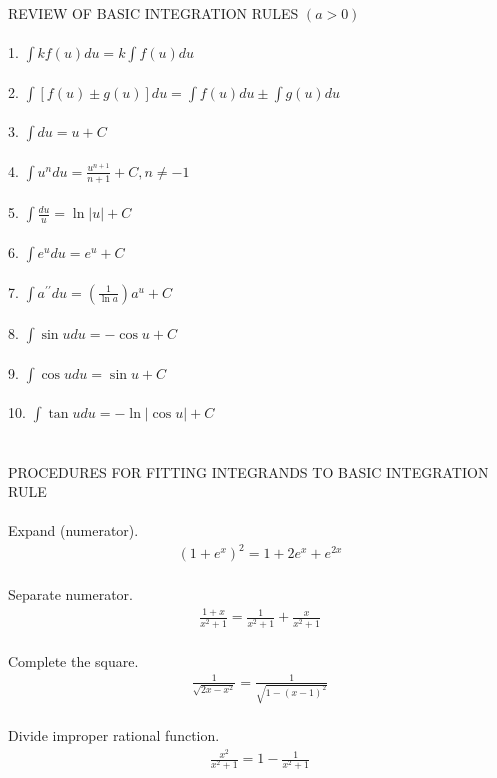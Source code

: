 \documentclass{report}
\begin{document}
REVIEW OF BASIC
INTEGRATION RULES $(a>0)$\\\\
1. $\int k f(u) d u=k \int f(u) d u$\\\\
2. $\int[f(u) \pm g(u)] d u= \int f(u) d u \pm \int g(u) d u$ \\\\
3. $\int d u=u+C$ \\\\
4. $\int u^n d u=\frac{u^{n+1}}{n+1}+C, n \neq-1$ \\\\
5. $\int \frac{d u}{u}=\ln |u|+C$ \\\\
6. $\int e^u d u=e^u+C$ \\\\
7. $\int a^{\prime \prime} d u=\left(\frac{1}{\ln a}\right) a^u+C$ \\\\
8. $\int \sin u d u=-\cos u+C$ \\\\
9. $\int \cos u d u=\sin u+C$ \\ \\
10. $\int \tan u d u=-\ln |\cos u|+C$ \\\\\\
PROCEDURES FOR FITTING INTEGRANDS TO BASIC INTEGRATION RULE \\\\

Expand (numerator).
\begin{align}
\left(1+e^x\right)^2=1+2 e^x+e^{2 x} \\
\end{align}

Separate numerator.
\begin{align}
	\frac{1+x}{x^2+1}=\frac{1}{x^2+1}+\frac{x}{x^2+1} \\
\end{align}

Complete the square.
\begin{align}
	\frac{1}{\sqrt{2 x-x^2}}=\frac{1}{\sqrt{1-(x-1)^2}} \\
\end{align}

Divide improper rational function.
\begin{align}
	\frac{x^2}{x^2+1}=1-\frac{1}{x^2+1} \\
\end{align}
\end{document}
